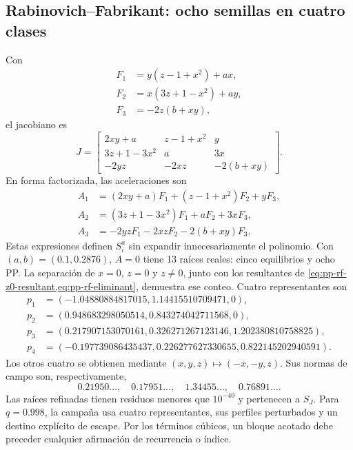 \subsection{Rabinovich--Fabrikant: ocho semillas en cuatro clases}
\label{subsec:casegt-rf}

Con
\begin{align}
 F_1&=y(z-1+x^2)+ax,\nonumber\\
 F_2&=x(3z+1-x^2)+ay,\\
 F_3&=-2z(b+xy),
 \label{casegt:eq:rf-field}
\end{align}
el jacobiano es
\begin{equation}
 J=\begin{bmatrix}
 2xy+a&z-1+x^2&y\\
 3z+1-3x^2&a&3x\\
 -2yz&-2xz&-2(b+xy)
 \end{bmatrix}.
 \label{casegt:eq:rf-J}
\end{equation}
En forma factorizada, las aceleraciones son
\begin{align}
 A_1&=(2xy+a)F_1+(z-1+x^2)F_2+yF_3,\nonumber\\
 A_2&=(3z+1-3x^2)F_1+aF_2+3xF_3,\\
 A_3&=-2yzF_1-2xzF_2-2(b+xy)F_3.
 \label{casegt:eq:rf-A}
\end{align}
Estas expresiones definen $S_i^a$ sin expandir innecesariamente el polinomio.
Con $(a,b)=(0.1,0.2876)$, $A=0$ tiene 13 raíces reales: cinco equilibrios y ocho
PP. La separación de $x=0$, $z=0$ y $z\ne0$, junto con los resultantes de
\cref{eq:pp-rf-z0-resultant,eq:pp-rf-eliminant}, demuestra ese conteo.
Cuatro representantes son
\begin{align}
 p_1&=(-1.04880884817015,1.14415510709471,0),\nonumber\\
 p_2&=(0.948683298050514,0.843274042711568,0),\nonumber\\
 p_3&=(0.217907153070161,0.326271267123146,1.202380810758825),\\
 p_4&=(-0.197739086435437,0.226277627330655,0.822145202940591).
 \label{casegt:eq:rf-PP}
\end{align}
Los otros cuatro se obtienen mediante
$(x,y,z)\mapsto(-x,-y,z)$. Sus normas de campo son, respectivamente,
\begin{equation}
 0.21950\ldots,
 \quad0.17951\ldots,
 \quad1.34455\ldots,
 \quad0.76891\ldots.
 \label{casegt:eq:rf-PP-speeds}
\end{equation}
Las raíces refinadas tienen residuos menores que $10^{-40}$ y pertenecen a $S_J$. Para
$q=0.998$, la campaña usa cuatro representantes, sus perfiles perturbados y un
destino explícito de escape. Por los términos cúbicos, un bloque acotado debe
preceder cualquier afirmación de recurrencia o índice.

